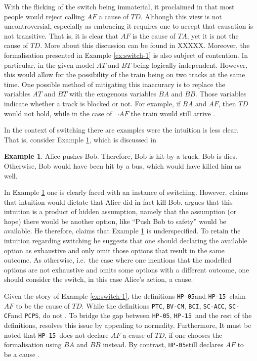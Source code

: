 \documentclass[11pt,a4paper]{book}
\theoremstyle{definition}
\theoremstyle{definition}
\newtheorem{example}{Example}[section]
\theoremstyle{definition}
\theoremstyle{remark}
\newcommand{\hpu}{\texttt{HP-05}}
\newcommand{\ptc}{\texttt{PTC}}
\newcommand{\hpm}{\texttt{HP-15 }}
\newcommand{\bvcm}{\texttt{BV-CM}}
\newcommand{\bci}{\texttt{BCI}}
\newcommand{\scacc}{\texttt{SC-ACC}}
\newcommand{\pcps}{\texttt{PCPS}}
\newcommand{\sccf}{\texttt{SC-CF}}
\begin{document}
With the flicking of the switch being immaterial, it proclaimed in \parencite{beckers2018principled} that most people would reject calling $AF$ a cause of $TD$. 
Although this view is not uncontroversial, especially as embracing it requires one to accept that causation is not transitive. 
That is, it is clear that $AF$ is the cause of $TA$, yet it is not the cause of $TD$. More about this discussion can be found in XXXXX.
Moreover, the formalisation presented in Example \ref{ex:switch-1} is also subject of contention. In particular, in the given model $AT$ and $BT$ being logically independent. However, this would allow for the possibility 
of the train being on two tracks at the same time. One possible method of mitigating this inaccuracy is to replace the variables $AT$ and $BT$ with the exogenous variables $BA$ and $BB$.
Those variables indicate whether a track is blocked or not. For example, if $BA$ and $AF$, then $TD$ would not hold, while in the case of $\neg AF$ the train would still arrive \parencite{halpern2011actual}.

In the context of switching there are examples were the intuition is less clear. That is, consider Example \ref{ex:switch-2}, which is discussed in \parencite{weslake2015partial,bochman2018actual}

\begin{example}
\label{ex:switch-2}
Alice pushes Bob. Therefore, Bob is hit by a truck. Bob is dies.
Otherwise, Bob would have been hit by a bus, which would have killed him as well.
\end{example}

In Example \ref{ex:switch-2} one is clearly faced with an instance of switching. However, \parencite{mcdermott1995redundant} claims that intuition would dictate that Alice did in fact kill Bob.
\parencite{weslake2015partial} argues that this intuition is a product of hidden assumption, namely that the assumption (or hope) there would be another option, like ``Push Bob to safety'' would be available.
He therefore, claims that Example \ref{ex:switch-2} is underspecified.
To retain the intuition regarding switching he suggests that one should declaring the available option as exhaustive and only omit those options that result in the same outcome.
As otherwise, i.e.\ the case where one mentions that the modelled options are not exhaustive and omits some options with a different outcome, one should consider the switch, in this case Alice's action,  a cause.


Given the story of Example \ref{ex:switch-1}, the definitions \hpu and \hpm claim $AF$ to be the cause of $TD$.
While the definitions \ptc,  \bvcm,  \bci, \scacc, \sccf and \pcps, do not \parencite{beckers2018principled,bochman2018actual,denecker2018causal,weslake2015partial,halpern2015modification,batusov2018situation}.
To bridge the gap between  \hpu, \hpm and the rest of the definitions, \parencite{halpern2015modification} resolves this issue by appealing to normality.
Furthermore, It must be noted that \hpm does not declare $AF$ a cause of $TD$, if one chooses the formalisation using $BA$ and $BB$ instead.
By contrast, \hpu still declares $AF$ to be a cause \parencite{halpern2015modification}. 
\end{document}
